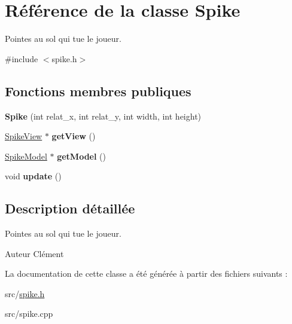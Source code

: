 \hypertarget{class_spike}{\section{Référence de la classe Spike}
\label{class_spike}
}


Pointes au sol qui tue le joueur.  




{\ttfamily \#include $<$spike.\+h$>$}

\subsection*{Fonctions membres publiques}
\begin{DoxyCompactItemize}
\item 
\hypertarget{class_spike_a130484d6ec64ec3d93c6adcee150baaa}{{\bfseries Spike} (int relat\+\_\+x, int relat\+\_\+y, int width, int height)}\label{class_spike_a130484d6ec64ec3d93c6adcee150baaa}

\item 
\hypertarget{class_spike_a82cc5c8d05dd255502f868b7a8408366}{\hyperlink{class_spike_view}{Spike\+View} $\ast$ {\bfseries get\+View} ()}\label{class_spike_a82cc5c8d05dd255502f868b7a8408366}

\item 
\hypertarget{class_spike_aba99d64ca358dec4366b8e8bd858b159}{\hyperlink{class_spike_model}{Spike\+Model} $\ast$ {\bfseries get\+Model} ()}\label{class_spike_aba99d64ca358dec4366b8e8bd858b159}

\item 
\hypertarget{class_spike_ad9392deea9229c20d12a7011f322c436}{void {\bfseries update} ()}\label{class_spike_ad9392deea9229c20d12a7011f322c436}

\end{DoxyCompactItemize}


\subsection{Description détaillée}
Pointes au sol qui tue le joueur. 

\begin{DoxyAuthor}{Auteur}
Clément 
\end{DoxyAuthor}


La documentation de cette classe a été générée à partir des fichiers suivants \+:\begin{DoxyCompactItemize}
\item 
src/\hyperlink{spike_8h}{spike.\+h}\item 
src/spike.\+cpp\end{DoxyCompactItemize}
